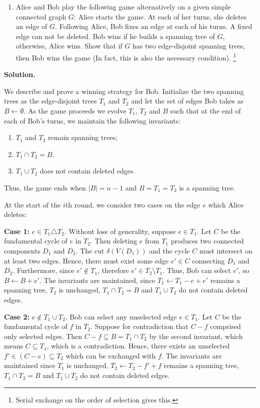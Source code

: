 \documentclass[11pt,letterpaper]{article}
\theoremstyle{definition}
\newcommand{\solution}{\medskip\noindent\textbf{Solution.}\par\medskip}
\begin{document}
\begin{enumerate}[resume=q]
\item Alice and Bob play the following game alternatively on a given simple connected graph $G$: Alice starts the game. At each of her turns, she deletes an edge of $G$. Following Alice, Bob fixes an edge at each of his turns. A fixed edge can not be deleted. Bob wins if he builds a spanning tree of $G$, otherwise, Alice wins. Show that if $G$ has two edge-disjoint spanning trees, then Bob wins the game (In fact, this is also the necessary condition).
\footnote{Serial exchange on the order of selection gives this.}
\end{enumerate}

\solution
We describe and prove a winning strategy for Bob.
Initialize the two spanning trees as the edge-disjoint trees $T_1$ and $T_2$ and let the set of edges Bob takes as $B\gets \emptyset$.
As the game proceeds we evolve $T_1$, $T_2$ and $B$ such that at the end of each of Bob's turns, we maintain the following invariants:
\begin{enumerate}
    \item $T_1$ and $T_2$ remain spanning trees;
    \item $T_1\cap T_2 = B$.
    \item $T_1\cup T_2$ does not contain deleted edges.
\end{enumerate}
Thus, the game ends when $|B|=n-1$ and $B=T_1=T_2$ is a spanning tree.

At the start of the $i$th round, we consider two cases on the edge $e$ which Alice deletes:

\textbf{Case 1: }$e\in T_1\triangle T_2$. Without loss of generality, suppose $e\in T_1$. 
Let $C$ be the fundamental cycle of $e$ in $T_2$.
Then deleting $e$ from $T_1$ produces two connected components $D_1$ and $D_2$.
The cut $\delta(V(D_1))$ and the cycle $C$ must intersect on at least two edges.
Hence, there must exist some edge $e'\in C$ connecting $D_1$ and $D_2$.
Furthermore, since $e'\notin T_1$, therefore $e'\in T_2\setminus T_1$.
Thus, Bob can select $e'$, so $B\gets B+e'$. 
The invariants are maintained, since $T_1\gets T_1-e+e'$ remains a spanning tree, $T_2$ is unchanged, $T_1\cap T_2=B$ and $T_1\cup T_2$ do not contain deleted edges.

\textbf{Case 2: }$e\notin T_1\cup T_2$. 
Bob can select any unselected edge $e\in T_1$.
Let $C$ be the fundamental cycle of $f$ in $T_2$.
Suppose for contradiction that $C-f$ comprised only selected edges. 
Then $C-f\subseteq B = T_1\cap T_2$ by the second invariant, which means $C\subseteq T_1$, which is a contradiction.
Hence, there exists an unselected $f'\in (C-e) \subseteq T_2$ which can be exchanged with $f$.
The invariants are maintained since $T_1$ is unchanged, $T_2\gets T_2-f'+f$ remains a spanning tree, $T_1\cap T_2=B$ and $T_1\cup T_2$ do not contain deleted edges.
\end{document}
